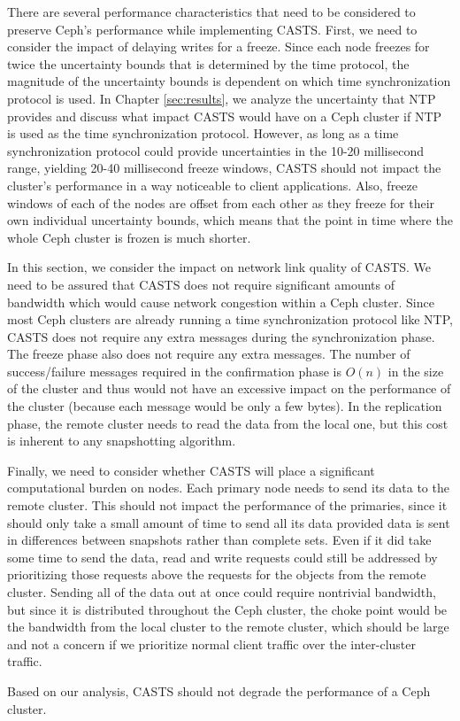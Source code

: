 There are several performance characteristics that need to be
considered to preserve Ceph's performance while implementing CASTS. 
First, we need to consider the impact of
delaying writes for a freeze. Since each node freezes for twice the
uncertainty bounds that is determined by the time protocol, the
magnitude of the uncertainty bounds is dependent on which time
synchronization protocol is used. In Chapter \ref{sec:results}, we
analyze the uncertainty that NTP provides and discuss what impact CASTS
would have on a Ceph cluster if NTP is used as the
time synchronization protocol. However, as long as a time
synchronization protocol could provide uncertainties in the 10-20
millisecond range, yielding 20-40 millisecond
freeze %
windows, CASTS should not impact the cluster's performance in
a way noticeable to client applications.  Also, freeze windows of each
of the nodes are offset from each other as they freeze for their own
individual uncertainty bounds, which means that the point in time
where the whole Ceph cluster is frozen is much shorter.

In this section, we consider the impact on network link quality of
CASTS. We need to be assured that CASTS does not
require significant amounts of bandwidth which would cause network
congestion within a Ceph cluster. Since most Ceph clusters are already
running a time synchronization protocol like NTP, CASTS does
not require any extra messages during the synchronization phase. The
freeze phase also does not require any extra messages. The number of
success/failure messages required in the confirmation phase is $O(n)$
in the size of the cluster and thus would not have an excessive impact
on the performance of the cluster (because each message would be only
a few bytes). In the replication phase, the remote cluster needs to
read the data from the local one, but this cost is inherent to any
snapshotting algorithm.

Finally, we need to consider whether CASTS will place a
significant computational burden on nodes. Each primary node needs to
send its data to the remote cluster. This should not impact the
performance of the primaries, since it should only take a small amount
of time to send all its data provided data is sent in differences
between snapshots rather than complete sets. Even if it did take some
time to send the data, read and write requests could still be
addressed by prioritizing those requests above the requests for the
objects from the remote cluster. Sending all of the data out at once
could require nontrivial bandwidth, but since it is distributed
throughout the Ceph cluster, the choke point would be the bandwidth
from the local cluster to the remote cluster, which should be large
and not a concern if we prioritize normal client traffic over the
inter-cluster traffic.

Based on our analysis, CASTS should not degrade the
performance of a Ceph cluster.
